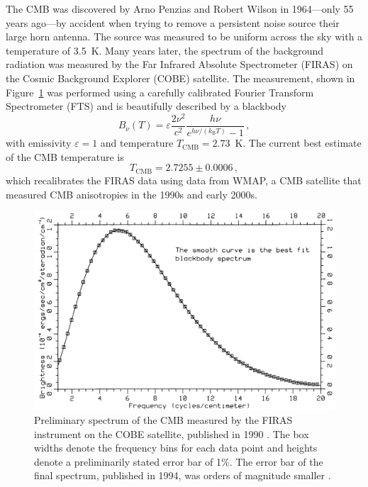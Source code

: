 The CMB was discovered by Arno Penzias and Robert Wilson in 1964---only 55 years ago---by accident when trying to remove a persistent noise source their large horn antenna. The source was measured to be uniform across the sky with a temperature of 3.5~K. Many years later, the spectrum of the background radiation was measured by the Far Infrared Absolute Spectrometer (FIRAS) on the Cosmic Background Explorer (COBE) satellite. The measurement, shown in Figure~\ref{fig:cmb_spectrum} was performed using a carefully calibrated Fourier Transform Spectrometer (FTS) and is beautifully described by a blackbody
\begin{equation}
    B_{\nu}(T) = \varepsilon \frac{2 \nu^{2}}{c^{2}} \frac{h \nu}{e^{h \nu / (k_{\mathrm{B}} T)} - 1} \, , 
\end{equation}
with emissivity $\varepsilon = 1$ and temperature $T_{\mathrm{CMB}} = 2.73$~K. The current best estimate of the CMB temperature is
\begin{equation}
    T_{\mathrm{CMB}} = 2.7255 \pm 0.0006 \, ,
    \label{eq:cmb_temperature}
\end{equation}
which recalibrates the FIRAS data using data from WMAP, a CMB satellite that measured CMB anisotropies in the 1990s and early 2000s.

\begin{figure}
    \centering
    \includegraphics[width=0.7\linewidth]{ScientificMotivation/Figures/FIRAS_CMB_Spectrum_1990.png}
    \caption[FIRAS CMB spectrum (1990)]{Preliminary spectrum of the CMB measured by the FIRAS instrument on the COBE satellite, published in 1990 \cite{mather_preliminary_1990}. The box widths denote the frequency bins for each data point and heights denote a preliminarily stated error bar of 1\%. The error bar of the final spectrum, published in 1994, was orders of magnitude smaller \cite{fixsen_cosmic_1996}.}
    \label{fig:cmb_spectrum}
\end{figure}

